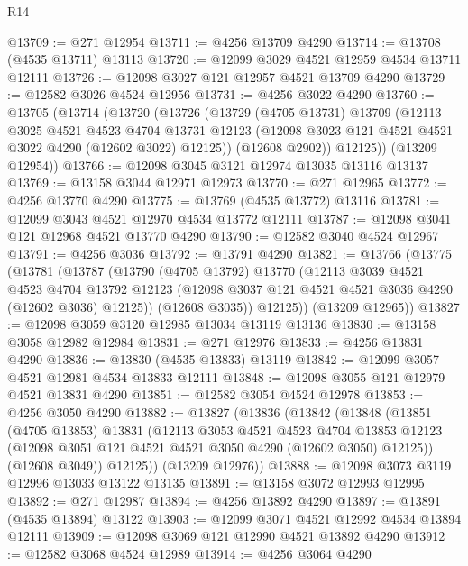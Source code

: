\begin{lexlean}{R14}
\begin{coremodule}
@13709 := @271 @12954
@13711 := @4256 @13709 @4290
@13714 := @13708 (@4535 @13711) @13113
@13720 := @12099 @3029 @4521 @12959 @4534 @13711 @12111
@13726 := @12098 @3027 @121 @12957 @4521 @13709 @4290
@13729 := @12582 @3026 @4524 @12956
@13731 := @4256 @3022 @4290
@13760 := @13705
    (@13714
      (@13720
        (@13726
          (@13729
            (@4705 @13731)
            @13709
            (@12113
              @3025
              @4521
              @4523
              @4704
              @13731
              @12123
              (@12098 @3023 @121 @4521 @4521 @3022 @4290 (@12602 @3022) @12125))
            (@12608 @2902))
          @12125))
      (@13209 @12954))
@13766 := @12098 @3045 @3121 @12974 @13035 @13116 @13137
@13769 := @13158 @3044 @12971 @12973
@13770 := @271 @12965
@13772 := @4256 @13770 @4290
@13775 := @13769 (@4535 @13772) @13116
@13781 := @12099 @3043 @4521 @12970 @4534 @13772 @12111
@13787 := @12098 @3041 @121 @12968 @4521 @13770 @4290
@13790 := @12582 @3040 @4524 @12967
@13791 := @4256 @3036
@13792 := @13791 @4290
@13821 := @13766
    (@13775
      (@13781
        (@13787
          (@13790
            (@4705 @13792)
            @13770
            (@12113
              @3039
              @4521
              @4523
              @4704
              @13792
              @12123
              (@12098 @3037 @121 @4521 @4521 @3036 @4290 (@12602 @3036) @12125))
            (@12608 @3035))
          @12125))
      (@13209 @12965))
@13827 := @12098 @3059 @3120 @12985 @13034 @13119 @13136
@13830 := @13158 @3058 @12982 @12984
@13831 := @271 @12976
@13833 := @4256 @13831 @4290
@13836 := @13830 (@4535 @13833) @13119
@13842 := @12099 @3057 @4521 @12981 @4534 @13833 @12111
@13848 := @12098 @3055 @121 @12979 @4521 @13831 @4290
@13851 := @12582 @3054 @4524 @12978
@13853 := @4256 @3050 @4290
@13882 := @13827
    (@13836
      (@13842
        (@13848
          (@13851
            (@4705 @13853)
            @13831
            (@12113
              @3053
              @4521
              @4523
              @4704
              @13853
              @12123
              (@12098 @3051 @121 @4521 @4521 @3050 @4290 (@12602 @3050) @12125))
            (@12608 @3049))
          @12125))
      (@13209 @12976))
@13888 := @12098 @3073 @3119 @12996 @13033 @13122 @13135
@13891 := @13158 @3072 @12993 @12995
@13892 := @271 @12987
@13894 := @4256 @13892 @4290
@13897 := @13891 (@4535 @13894) @13122
@13903 := @12099 @3071 @4521 @12992 @4534 @13894 @12111
@13909 := @12098 @3069 @121 @12990 @4521 @13892 @4290
@13912 := @12582 @3068 @4524 @12989
@13914 := @4256 @3064 @4290

\end{coremodule}
\end{lexlean}
